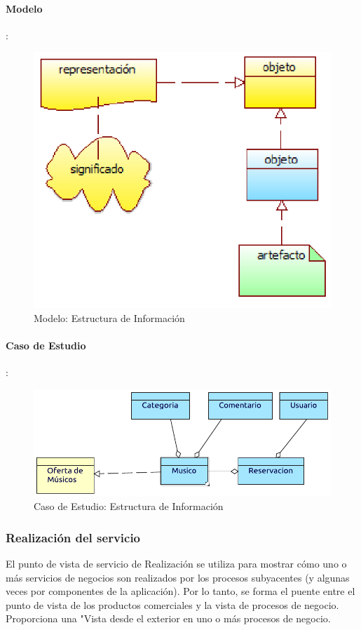 \paragraph{Modelo}:
\begin{figure}[h!]
	\centering
	\includegraphics[width=0.8\linewidth]{Desarrollo/ArquitecturaEmpresarial/Tecnologia/imgs/estructuraMetamodelo.PNG}
	\caption{Modelo: Estructura de Información}
\end{figure}
\newpage
\paragraph{Caso de Estudio}:

\begin{figure}[h!]
	\centering
	\includegraphics[width=\linewidth]{Desarrollo/ArquitecturaEmpresarial/Tecnologia/imgs/estructura.pdf}
	\caption{Caso de Estudio: Estructura de Información}
\end{figure}

\newpage

\subsubsection{Realización del servicio}
El punto de vista de servicio de Realización se utiliza para mostrar cómo uno o más servicios de negocios son realizados por los procesos subyacentes (y algunas veces por componentes de la aplicación). Por lo tanto, se forma el puente entre el punto de vista de los productos comerciales y la vista de procesos de negocio. Proporciona una "Vista desde el exterior en uno o más procesos de negocio.  \vspace{\baselineskip}

